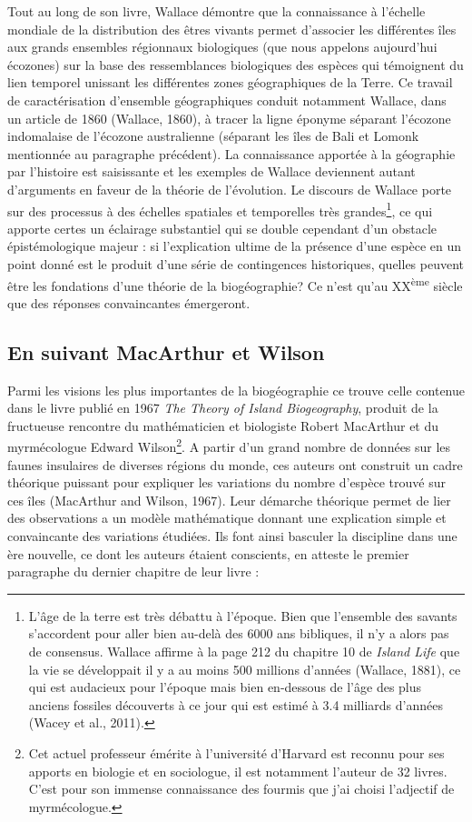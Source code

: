 Tout au long de son livre, Wallace démontre que la connaissance à
l'échelle mondiale de la distribution des êtres vivants permet
d'associer les différentes îles aux grands ensembles régionnaux
biologiques (que nous appelons aujourd'hui écozones) sur la base des
ressemblances biologiques des espèces qui témoignent du lien temporel
unissant les différentes zones géographiques de la Terre. Ce travail de
caractérisation d'ensemble géographiques conduit notamment Wallace, dans
un article de 1860 (Wallace, 1860), à tracer la ligne éponyme séparant
l'écozone indomalaise de l'écozone australienne (séparant les îles de
Bali et Lomonk mentionnée au paragraphe précédent). La connaissance
apportée à la géographie par l'histoire est saisissante et les exemples
de Wallace deviennent autant d'arguments en faveur de la théorie de
l'évolution. Le discours de Wallace porte sur des processus à des
échelles spatiales et temporelles très grandes\footnote{L'âge de la
  terre est très débattu à l'époque. Bien que l'ensemble des savants
  s'accordent pour aller bien au-delà des 6000 ans bibliques, il n'y a
  alors pas de consensus. Wallace affirme à la page 212 du chapitre 10
  de \emph{Island Life} que la vie se développait il y a au moins 500
  millions d'années (Wallace, 1881), ce qui est audacieux pour l'époque
  mais bien en-dessous de l'âge des plus anciens fossiles découverts à
  ce jour qui est estimé à 3.4 milliards d'années (Wacey et al., 2011).},
ce qui apporte certes un éclairage substantiel qui se double cependant
d'un obstacle épistémologique majeur : si l'explication ultime de la
présence d'une espèce en un point donné est le produit d'une série de
contingences historiques, quelles peuvent être les fondations d'une
théorie de la biogéographie? Ce n'est qu'au XX\textsuperscript{ème}
siècle que des réponses convaincantes émergeront.

\subsection*{En suivant MacArthur et
Wilson}\label{en-suivant-macarthur-et-wilson}

Parmi les visions les plus importantes de la biogéographie ce trouve
celle contenue dans le livre publié en 1967 \emph{The Theory of Island
Biogeography}, produit de la fructueuse rencontre du mathématicien et
biologiste Robert MacArthur et du myrmécologue Edward Wilson\footnote{Cet
  actuel professeur émérite à l'université d'Harvard est reconnu pour
  ses apports en biologie et en sociologue, il est notamment l'auteur de
  32 livres. C'est pour son immense connaissance des fourmis que j'ai
  choisi l'adjectif de myrmécologue.}. A partir d'un grand nombre de
données sur les faunes insulaires de diverses régions du monde, ces
auteurs ont construit un cadre théorique puissant pour expliquer les
variations du nombre d'espèce trouvé sur ces îles (MacArthur and Wilson,
1967). Leur démarche théorique permet de lier des observations a un
modèle mathématique donnant une explication simple et convaincante des
variations étudiées. Ils font ainsi basculer la discipline dans une ère
nouvelle, ce dont les auteurs étaient conscients, en atteste le premier
paragraphe du dernier chapitre de leur livre :

